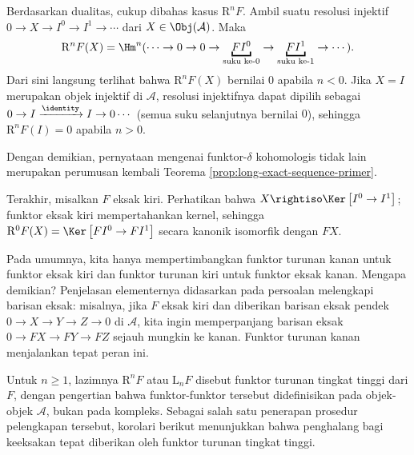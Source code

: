 \begin{bukti}
	Berdasarkan dualitas, cukup dibahas kasus $\mathrm{R}^n F$. Ambil suatu resolusi injektif $0 \to X \to I^0 \to I^1 \to \cdots$ dari $X \in \Obj(\mathcal{A})$. Maka
	\[ \mathrm{R}^n F(X) = \Hm^n ( \cdots \to 0 \to 0 \to \underbracket{FI^0}_{\text{suku ke-$0$}} \to \underbracket{FI^1}_{\text{suku ke-$1$}} \to \cdots ). \]
	Dari sini langsung terlihat bahwa $\mathrm{R}^n F(X)$ bernilai $0$ apabila $n < 0$. Jika $X = I$ merupakan objek injektif di $\mathcal{A}$, resolusi injektifnya dapat dipilih sebagai $0 \to I \xrightarrow{\identity} I \to 0 \cdots$ (semua suku selanjutnya bernilai $0$), sehingga $\mathrm{R}^n F(I) = 0$ apabila $n > 0$.
	
	Dengan demikian, pernyataan mengenai funktor-$\delta$ kohomologis tidak lain merupakan perumusan kembali Teorema \ref{prop:long-exact-sequence-primer}.

	Terakhir, misalkan $F$ eksak kiri. Perhatikan bahwa $X \rightiso \Ker\left[ I^0 \to I^1 \right]$; funktor eksak kiri mempertahankan kernel, sehingga $\mathrm{R}^0 F(X) = \Ker\left[ FI^0 \to FI^1 \right]$ secara kanonik isomorfik dengan $FX$.
\end{bukti}

Pada umumnya, kita hanya mempertimbangkan funktor turunan kanan untuk funktor eksak kiri dan funktor turunan kiri untuk funktor eksak kanan. Mengapa demikian? Penjelasan elementernya didasarkan pada persoalan melengkapi barisan eksak: misalnya, jika $F$ eksak kiri dan diberikan barisan eksak pendek $0 \to X \to Y \to Z \to 0$ di $\mathcal{A}$, kita ingin memperpanjang barisan eksak $0 \to FX \to FY \to FZ$ sejauh mungkin ke kanan. Funktor turunan kanan menjalankan tepat peran ini.

Untuk $n \geq 1$, lazimnya $\mathrm{R}^n F$ atau $\mathrm{L}_n F$ disebut funktor turunan tingkat tinggi dari $F$, dengan pengertian bahwa funktor-funktor tersebut didefinisikan pada objek-objek $\mathcal{A}$, bukan pada kompleks. Sebagai salah satu penerapan prosedur pelengkapan tersebut, korolari berikut menunjukkan bahwa penghalang bagi keeksakan tepat diberikan oleh funktor turunan tingkat tinggi.

